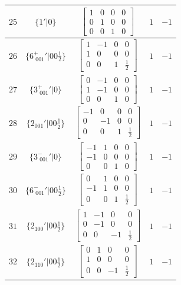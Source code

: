 \documentclass[fleqn,8pt]{jsarticle}
\begin{document}
\begin{longtable}{ccccc}
$ 25 $ & $ \{1{}'|0\} $ & $ \begin{bmatrix} 1 & 0 & 0 & 0 \\ 0 & 1 & 0 & 0 \\ 0 & 0 & 1 & 0 \end{bmatrix} $ & $ 1 $ & $ -1 $ \\ \hline
$ 26 $ & $ \{6^{+}_{\,\,001}{}'|0 0 \frac{1}{2}\} $ & $ \begin{bmatrix} 1 & -1 & 0 & 0 \\ 1 & 0 & 0 & 0 \\ 0 & 0 & 1 & \frac{1}{2} \end{bmatrix} $ & $ 1 $ & $ -1 $ \\ \hline
$ 27 $ & $ \{3^{+}_{\,\,001}{}'|0\} $ & $ \begin{bmatrix} 0 & -1 & 0 & 0 \\ 1 & -1 & 0 & 0 \\ 0 & 0 & 1 & 0 \end{bmatrix} $ & $ 1 $ & $ -1 $ \\ \hline
$ 28 $ & $ \{2{}_{001}{}'|0 0 \frac{1}{2}\} $ & $ \begin{bmatrix} -1 & 0 & 0 & 0 \\ 0 & -1 & 0 & 0 \\ 0 & 0 & 1 & \frac{1}{2} \end{bmatrix} $ & $ 1 $ & $ -1 $ \\ \hline
$ 29 $ & $ \{3^{-}_{\,\,001}{}'|0\} $ & $ \begin{bmatrix} -1 & 1 & 0 & 0 \\ -1 & 0 & 0 & 0 \\ 0 & 0 & 1 & 0 \end{bmatrix} $ & $ 1 $ & $ -1 $ \\ \hline
$ 30 $ & $ \{6^{-}_{\,\,001}{}'|0 0 \frac{1}{2}\} $ & $ \begin{bmatrix} 0 & 1 & 0 & 0 \\ -1 & 1 & 0 & 0 \\ 0 & 0 & 1 & \frac{1}{2} \end{bmatrix} $ & $ 1 $ & $ -1 $ \\ \hline
$ 31 $ & $ \{2{}_{100}{}'|0 0 \frac{1}{2}\} $ & $ \begin{bmatrix} 1 & -1 & 0 & 0 \\ 0 & -1 & 0 & 0 \\ 0 & 0 & -1 & \frac{1}{2} \end{bmatrix} $ & $ 1 $ & $ -1 $ \\ \hline
$ 32 $ & $ \{2{}_{110}{}'|0 0 \frac{1}{2}\} $ & $ \begin{bmatrix} 0 & 1 & 0 & 0 \\ 1 & 0 & 0 & 0 \\ 0 & 0 & -1 & \frac{1}{2} \end{bmatrix} $ & $ 1 $ & $ -1 $ \\ \hline

\end{longtable}
\end{document}
